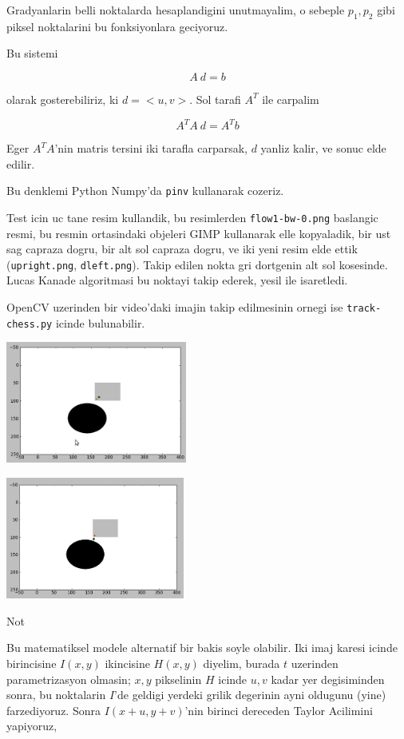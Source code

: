 \documentclass[12pt,fleqn]{article}
\begin{document}
Gradyanlarin belli noktalarda hesaplandigini unutmayalim, o sebeple $p_1,
p_2$ gibi piksel noktalarini bu fonksiyonlara geciyoruz. 

Bu sistemi

\[ A \ d = b \]

olarak gosterebiliriz, ki $d = <u,v>$. Sol tarafi $A^T$ ile carpalim

\[ A^TA \ d = A^Tb \]

Eger $A^TA$'nin matris tersini iki tarafla carparsak, $d$ yanliz kalir, ve
sonuc elde edilir. 

Bu denklemi Python Numpy'da \verb!pinv! kullanarak cozeriz.

Test icin uc tane resim kullandik, bu resimlerden \verb!flow1-bw-0.png!
baslangic resmi, bu resmin ortasindaki objeleri GIMP kullanarak elle
kopyaladik, bir ust sag capraza dogru, bir alt sol capraza dogru, ve iki
yeni resim elde ettik (\verb!upright.png!, \verb!dleft.png!). Takip edilen
nokta gri dortgenin alt sol kosesinde. Lucas Kanade algoritmasi bu noktayi
takip ederek, yesil ile isaretledi.

OpenCV uzerinden bir video'daki imajin takip edilmesinin ornegi ise
\verb!track-chess.py! icinde bulunabilir. 

\includegraphics[height=4cm]{res1.png}

\includegraphics[height=4cm]{res2.png}





Not

Bu matematiksel modele alternatif bir bakis soyle olabilir. Iki imaj karesi
icinde birincisine $I(x,y)$ ikincisine $H(x,y)$ diyelim, burada $t$
uzerinden parametrizasyon olmasin; $x,y$ pikselinin $H$ icinde $u,v$ kadar
yer degisiminden sonra, bu noktalarin $I$'de geldigi yerdeki grilik degerinin
ayni oldugunu (yine) farzediyoruz. Sonra $I(x+u,y+v)$'nin birinci
dereceden Taylor Acilimini yapiyoruz, 
\end{document}
